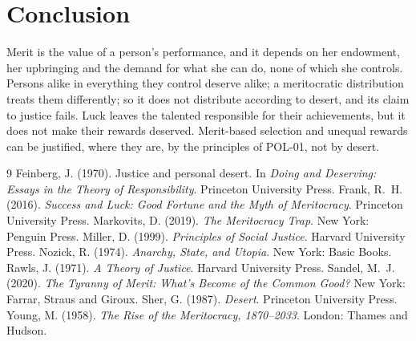 \documentclass{situationist-preprint}
\begin{document}
\section{Conclusion}

Merit is the value of a person's performance, and it depends on her endowment, her upbringing and the demand for what she can do, none of which she controls. Persons alike in everything they control deserve alike; a meritocratic distribution treats them differently; so it does not distribute according to desert, and its claim to justice fails. Luck leaves the talented responsible for their achievements, but it does not make their rewards deserved. Merit-based selection and unequal rewards can be justified, where they are, by the principles of POL-01, not by desert.

\begin{thebibliography}{9}\small
{} Feinberg, J. (1970). Justice and personal desert. In \emph{Doing and Deserving: Essays in the Theory of Responsibility}. Princeton University Press.
 Frank, R.~H. (2016). \emph{Success and Luck: Good Fortune and the Myth of Meritocracy}. Princeton University Press.
 Markovits, D. (2019). \emph{The Meritocracy Trap}. New York: Penguin Press.
 Miller, D. (1999). \emph{Principles of Social Justice}. Harvard University Press.
 Nozick, R. (1974). \emph{Anarchy, State, and Utopia}. New York: Basic Books.
 Rawls, J. (1971). \emph{A Theory of Justice}. Harvard University Press.
 Sandel, M.~J. (2020). \emph{The Tyranny of Merit: What's Become of the Common Good?} New York: Farrar, Straus and Giroux.
 Sher, G. (1987). \emph{Desert}. Princeton University Press.
 Young, M. (1958). \emph{The Rise of the Meritocracy, 1870--2033}. London: Thames and Hudson.
\end{thebibliography}
\end{document}
